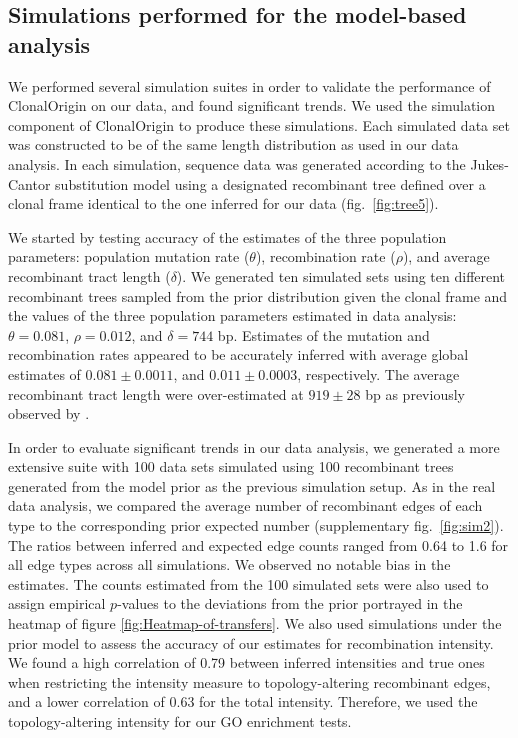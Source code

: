 \documentclass[12pt]{article}
\providecommand{\\}{\\}
\begin{document}
\subsection{Simulations performed for the model-based analysis}

We performed several simulation suites in order to validate the performance of
ClonalOrigin on our data, and found significant trends. We used the simulation
component of ClonalOrigin to produce these simulations. Each simulated data set
was constructed to be of the same length distribution as used in our data
analysis. In each simulation, sequence data was generated according to the
Jukes-Cantor substitution model 
\citep{Jukes1969}
using a designated recombinant tree defined over
a clonal frame identical to the one inferred for our data (fig.\
\ref{fig:tree5}).

We started by testing accuracy of the estimates of the three population
parameters: population mutation rate ($\theta$), recombination rate ($\rho$),
and average recombinant tract length ($\delta$). We generated ten simulated sets
using ten different recombinant trees sampled from the prior distribution
given the clonal frame and the values of the three population parameters
estimated in data analysis: $\theta=0.081$, $\rho=0.012$, and $\delta=744$ bp.
Estimates of the mutation and recombination rates appeared to be accurately
inferred with average global estimates of $0.081\pm 0.0011$, and $0.011\pm
0.0003$, respectively. The average recombinant tract length were over-estimated at
$919\pm28$ bp as previously observed by \citealp{Didelot2010}.

In order to evaluate significant trends in our data analysis, we generated a
more extensive suite with 100 data sets simulated using 100 recombinant trees
generated from the model prior as the previous simulation setup.  As in the real
data analysis, we compared the average number of recombinant edges of each type
to the corresponding prior expected number (supplementary fig.\
\ref{fig:sim2}). The ratios between inferred and expected edge counts ranged
from 0.64 to 1.6 for all edge types across all simulations. We observed no
notable bias in the estimates. The counts estimated from the 100 simulated sets
were also used to assign empirical $p$-values to the deviations from the prior
portrayed in the heatmap of figure \ref{fig:Heatmap-of-transfers}. We also used
simulations under the prior model to assess the accuracy of our estimates for
recombination intensity. We found a high correlation of 0.79 between inferred
intensities and true ones when restricting the intensity measure to
topology-altering recombinant edges, and a lower correlation of 0.63 for the
total intensity. Therefore, we used the topology-altering intensity for our GO
enrichment tests.
\end{document}
